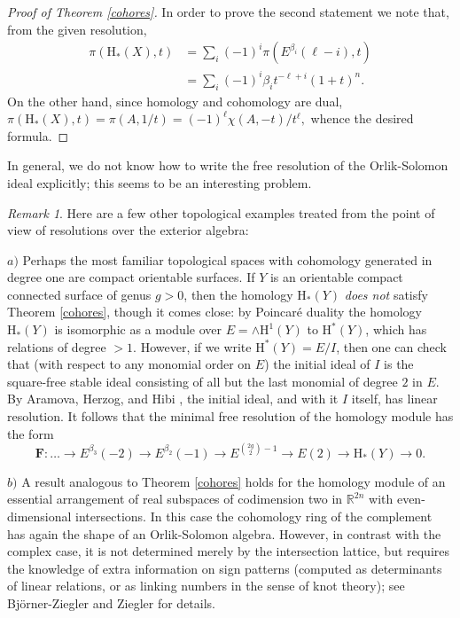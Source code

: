 \documentclass{tran-l}
\theoremstyle{definition}
\theoremstyle{remark}
\newtheorem{remark}[theorem]{Remark}
\newcommand{\FF}{{\mathbf{F}}}
\newcommand{\rH}{{\mathrm H}}
\begin{document}
\begin{proof}[Proof of Theorem \ref{cohores}]
In order to prove the second statement we note that, from the
given resolution, 
\[\begin{split}
\pi(\rH_*(X), t)&=\sum_i (-1)^i\pi(E^{\beta_i}(\ell-i),t)\\
                  &=\sum_i (-1)^i\beta_it^{-\ell+i}(1+t)^n.
\end{split}
\]                  
On the other hand, since homology and cohomology are dual,
$
\pi(\rH_*(X), t)=\pi(A,1/t)=(-1)^\ell\chi(A,-t)/t^\ell,
$
whence the desired formula.\end{proof}

In general, we do not know how to write the free resolution of the
Orlik-Solomon ideal explicitly; this seems to be an interesting problem. 

\begin{remark}\label{surfaces} Here are a few other topological examples
treated from the point of view of resolutions over
the exterior algebra: 

$a)$ Perhaps the most familiar topological spaces with
cohomology generated in degree one are compact orientable
surfaces. If $Y$ is an
orientable compact connected surface of genus
$g>0$, then the homology $\rH_*(Y)$ {\it does not\/}
satisfy Theorem \ref{cohores}, though it comes close: 
by Poincar\'e duality the homology
$\rH_*(Y)$ is isomorphic as a module over $E=\wedge \rH^1(Y)$
to $\rH^*(Y)$, which
has relations of degree $>1$. 
However, if we write $\rH^*(Y)=E/I$, then one can check that
(with respect
to any monomial order on $E$) the initial ideal of $I$
is the square-free
stable ideal consisting of all but the last monomial of degree 
$2$ in $E$.
By Aramova, Herzog, and Hibi \cite[Corollary
2.5]{AHH}, the initial ideal, and with it
$I$ itself, has linear resolution.  It follows that the  minimal free
resolution of the homology module has the form
\[
\FF:
\dots\to 
E^{\beta_3}(-2)\to 
E^{\beta_2}(-1)\to 
E^{\binom{2g}{2}-1}\to 
E(2)\to 
\rH_*(Y)\to 0.
\]

$b)$ A result analogous to
Theorem \ref{cohores} holds for the homology module of an essential
arrangement of real subspaces of codimension two in ${\mathbb R}^{2n}$
with even-dimensional intersections. In this case the cohomology ring of
the complement has again the shape of an Orlik-Solomon algebra. However,
in contrast with the complex case, it is not determined merely by the
intersection lattice,  but requires the knowledge of extra information
on sign patterns (computed as determinants of linear relations, or as
linking numbers in the sense of knot theory); see Bj\"orner-Ziegler
\cite{BZ} and Ziegler \cite{Zi} for details.


\end{remark}
\end{document}
